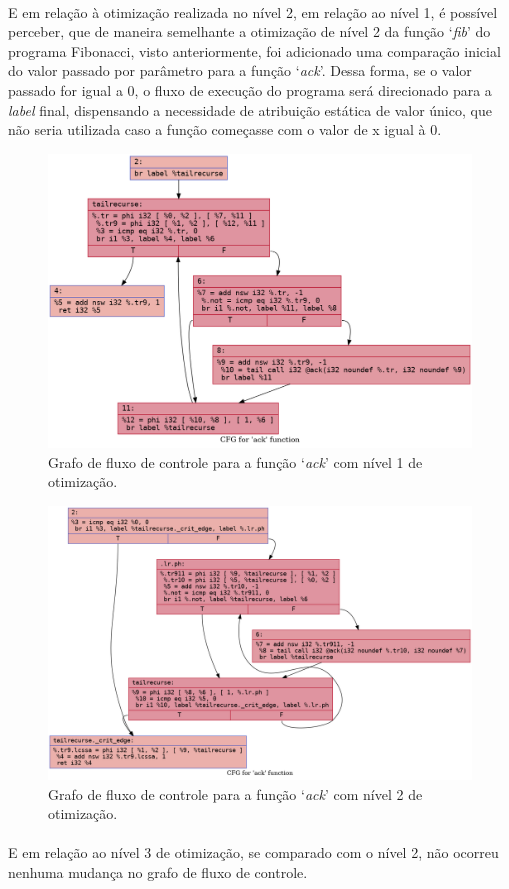 \documentclass[12pt]{article}
\begin{document}
\paragraph{}E em relação à otimização realizada no nível 2, em relação ao nível 1, é possível perceber, que de maneira semelhante a otimização de nível 2 da função ‘\textit{fib}’ do programa Fibonacci, visto anteriormente, foi adicionado uma comparação inicial do valor passado por parâmetro para a função ‘\textit{ack}’. Dessa forma, se o valor passado for igual a 0, o fluxo de execução do programa será direcionado para a \textit{label} final, dispensando a necessidade de atribuição estática de valor único, que não seria utilizada caso a função começasse com o valor de x igual à 0.

\begin{figure}
    \centering
    \includegraphics[width=0.5\linewidth]{recursive_.ack_O1.png}
    \caption{Grafo de fluxo de controle para a função ‘\textit{ack}’ com nível 1 de otimização.}
\end{figure}

\begin{figure}
    \centering
    \includegraphics[width=0.5\linewidth]{recursive_.ack_O2.png}
    \caption{Grafo de fluxo de controle para a função ‘\textit{ack}’ com nível 2 de otimização.}
\end{figure}

\paragraph{}E em relação ao nível 3 de otimização, se comparado com o nível 2, não ocorreu nenhuma mudança no grafo de fluxo de controle.
\end{document}
